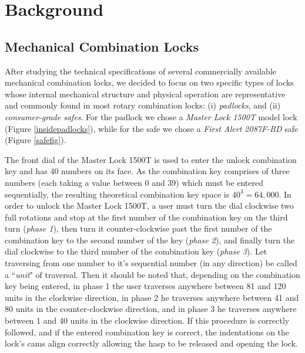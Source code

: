 \documentclass[]{IEEEtran}
\begin{document}
\section{Background}
\label{background}

\subsection{Mechanical Combination Locks}
\label{locks}
After studying the technical specifications of several commercially available mechanical combination locks, we decided to focus on two specific types of locks whose internal mechanical structure and physical operation are representative and commonly found in most rotary combination locks: (i) \emph{padlocks}, and (ii) \emph{consumer-grade safes}. For the padlock we chose a \emph{Master Lock 1500T} model lock (Figure \ref{insidepadlocks}), while for the safe we chose a \emph{First Alert 2087F-BD} safe (Figure \ref{safefig}). 

The front dial of the Master Lock 1500T is used to enter the unlock combination key and has 40 numbers on its face. As the combination key comprises of three numbers (each taking a value between 0 and 39) which must be entered sequentially, the resulting theoretical combination key space is  $40^3=64,000$. In order to unlock the Master Lock 1500T, a user must turn the dial clockwise two full rotations and stop at the first number of the combination key on the third turn (\emph{phase 1}), then turn it counter-clockwise past the first number of the combination key to the second number of the key (\emph{phase 2}), and finally turn the dial clockwise to the third number of the combination key (\emph{phase 3}). Let traversing from one number to it's sequential number (in any direction) be called a ``\emph{unit}" of traversal. Then it should be noted that, depending on the combination key being entered, in phase 1 the user traverses anywhere between 81 and 120 units in the clockwise direction, in phase 2 he traverses anywhere between 41 and 80 units in the counter-clockwise direction, and in phase 3 he traverses anywhere between 1 and 40 units in the clockwise direction. If this procedure is correctly followed, and if the entered combination key is correct, the indentations on the lock's cams align correctly allowing the hasp to be released and opening the lock. 
\end{document}
